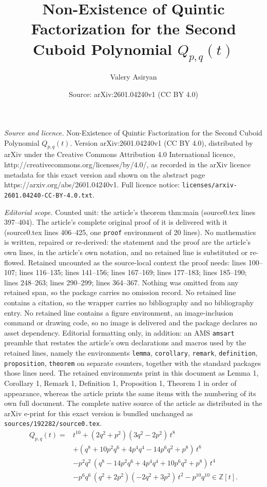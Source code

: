 \documentclass[10pt,a4paper]{amsart}
\title{Non-Existence of Quintic Factorization for the Second Cuboid Polynomial $Q_{p,q}(t)$}
\author{Valery Asiryan}
\date{Source: arXiv:2601.04240v1 (CC BY 4.0)}
\begin{document}
\maketitle

\noindent\emph{Source and licence.} Non-Existence of Quintic Factorization for the Second Cuboid Polynomial $Q_{p,q}(t)$. Version arXiv:2601.04240v1 (CC BY 4.0), distributed by arXiv under the Creative Commons Attribution 4.0 International licence, http://creativecommons.org/licenses/by/4.0/, as recorded in the arXiv licence metadata for this exact version and shown on the abstract page https://arxiv.org/abs/2601.04240v1. Full licence notice: \texttt{licenses/arxiv-2601.04240-CC-BY-4.0.txt}.\par\smallskip

\noindent\textit{Editorial scope.} Counted unit: the article's theorem thm:main (source0.tex lines 397--404). The article's complete original proof of it is delivered with it (source0.tex lines 406--425, one \texttt{proof} environment of 20 lines). No mathematics is written, repaired or re-derived: the statement and the proof are the article's own lines, in the article's own notation, and no retained line is substituted or re-flowed.  Retained uncounted as the source-local context the proof needs: lines 100--107; lines 116--135; lines 141--156; lines 167--169; lines 177--183; lines 185--190; lines 248--263; lines 290--299; lines 364--367.  Nothing was omitted from any retained span, so the package carries no omission record.  No retained line contains a citation, so the wrapper carries no bibliography and no bibliography entry.  No retained line contains a figure environment, an image-inclusion command or drawing code, so no image is delivered and the package declares no asset dependency.  Editorial formatting only, in addition: an AMS \texttt{amsart} preamble that restates the article's own declarations and macros used by the retained lines, namely the environments \texttt{lemma}, \texttt{corollary}, \texttt{remark}, \texttt{definition}, \texttt{proposition}, \texttt{theorem} on separate counters, together with the standard packages those lines need.  The retained environments print in this document as Lemma 1, Corollary 1, Remark 1, Definition 1, Proposition 1, Theorem 1 in order of appearance, whereas the article prints the same items with the numbering of its own full document.  The complete native source of the article as distributed in the arXiv e-print for this exact version is bundled unchanged as \texttt{sources/192282/source0.tex}.
\begin{align}
Q_{p,q}(t)
={}&t^{10} + (2 q^{2} + p^{2})(3 q^{2} - 2 p^{2})\, t^{8} \nonumber\\
&+ (q^{8} + 10 p^{2} q^{6} + 4 p^{4} q^{4} - 14 p^{6} q^{2} + p^{8})\, t^{6} \nonumber\\
&- p^{2} q^{2}\,(q^{8} - 14 p^{2} q^{6} + 4 p^{4} q^{4} + 10 p^{6} q^{2} + p^{8})\, t^{4} \nonumber\\
&- p^{6} q^{6}\,(q^{2} + 2 p^{2})(-2 q^{2} + 3 p^{2})\, t^{2}
- p^{10} q^{10}\in\mathbb{Z}[t].\label{eq:Qpq}
\end{align}
\end{document}
